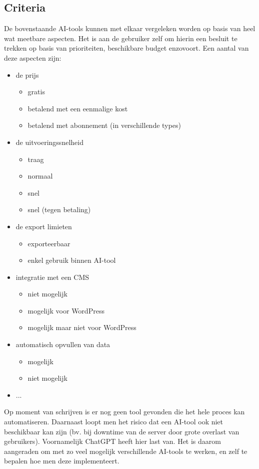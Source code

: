 \subsection{Criteria}
De bovenstaande AI-tools kunnen met elkaar vergeleken worden op basis van heel wat meetbare aspecten. Het is aan de gebruiker zelf om hierin een besluit te trekken op basis van prioriteiten, beschikbare budget enzovoort. Een aantal van deze aspecten zijn:
\begin{itemize}
    \item de prijs
    \begin{itemize}
        \item gratis
        \item betalend met een eenmalige kost
        \item betalend met abonnement (in verschillende types)
    \end{itemize} 
    \item de uitvoeringssnelheid
    \begin{itemize}
        \item traag
        \item normaal
        \item snel
        \item snel (tegen betaling)
    \end{itemize} 
    \item de export limieten
    \begin{itemize}
        \item exporteerbaar
        \item enkel gebruik binnen AI-tool
    \end{itemize}
    \item integratie met een CMS
    \begin{itemize}
        \item niet mogelijk
        \item mogelijk voor WordPress
        \item mogelijk maar niet voor WordPress
    \end{itemize}
    \item automatisch opvullen van data
    \begin{itemize}
        \item mogelijk
        \item niet mogelijk
    \end{itemize}
    \item ...    
\end{itemize}
Op moment van schrijven is er nog geen tool gevonden die het hele proces kan automatiseren. Daarnaast loopt men het risico dat een AI-tool ook niet beschikbaar kan zijn (bv. bij downtime van de server door grote overlast van gebruikers). Voornamelijk ChatGPT heeft hier last van. Het is daarom aangeraden om met zo veel mogelijk verschillende AI-tools te werken, en zelf te bepalen hoe men deze implementeert.

